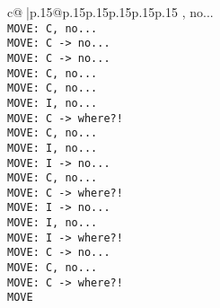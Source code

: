 \documentclass{article}
\begin{document}
{\begin{supertabular}{c@{$\;$}|p{.15\linewidth}@{}p{.15\linewidth}p{.15\linewidth}p{.15\linewidth}p{.15\linewidth}p{.15\linewidth}}
{{{, no...\\ \tt  MOVE: C, no...\\ \tt  MOVE: C -> no...\\ \tt  MOVE: C -> no...\\ \tt  MOVE: C, no...\\ \tt  MOVE: C, no...\\ \tt  MOVE: I, no...\\ \tt  MOVE: C -> where?!\\ \tt  MOVE: C, no...\\ \tt  MOVE: I, no...\\ \tt  MOVE: I -> no...\\ \tt  MOVE: C, no...\\ \tt  MOVE: C -> where?!\\ \tt  MOVE: I -> no...\\ \tt  MOVE: I, no...\\ \tt  MOVE: I -> where?!\\ \tt  MOVE: C -> no...\\ \tt  MOVE: C, no...\\ \tt  MOVE: C -> where?!\\ \tt  MOVE}}}
\end{supertabular}}
\end{document}
